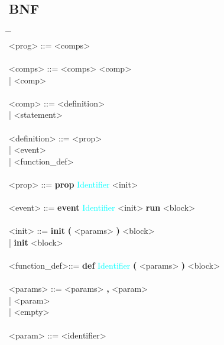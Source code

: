 \documentclass{Dokumentmall}
\begin{document}
\subsection{BNF}

\begin{tabbing}
  \= {} {} {} {} {} {} {} {} {} {} {} {} {} {} {} {} {} {} {} {} {} {} {} {} {} {} {} \= {} {} {} {} {} {} {} {} {} {} {} {} {} {} {} {} {} {}\= \\
  \><prog> \>::= \><comps> \\\\
  \><comps>  \>::= \><comps> <comp>\\
  \> \> | \> <comp> \\\\

  \><comp> \>::= \><definition>\\
  \> \>| \><statement>\\\\

  \><definition> \>::= \><prop>\\
  \> \>| \> <event> \\
  \> \>| \> <function\_def>\\\\

  \><prop> \>::= \>\textbf{prop} \textcolor{Cyan}{Identifier} { <init> }\\\\

  \><event> \>::= \>\textbf{event} \textcolor{Cyan}{Identifier} { <init> \textbf{run} <block> }\\\\

  \><init> \>::= \>\textbf{init} \textbf{(} <params> \textbf{)} <block>\\
  \> \>| \> \textbf{init} <block>\\\\

  \><function\_def>\>::= \>\textbf{def} \textcolor{Cyan}{Identifier} \textbf{(} <params> \textbf{)} <block>\\\\

  \><params> \>::= \><params> \textbf{,} <param>\\
  \> \>| \> <param>\\
  \> \>| \> <empty>\\\\

  \><param> \>::= \><identifier>\\\\


\end{tabbing}
\end{document}
